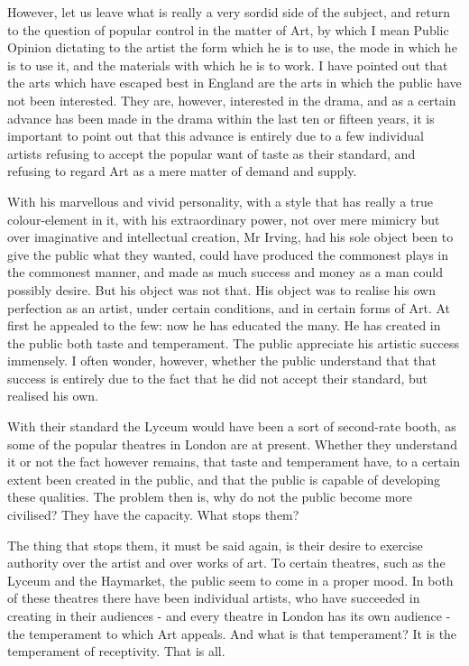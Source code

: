 However, let us leave what is really a very sordid side of the subject, and return to the question of popular control in the matter of Art, by which I mean Public Opinion dictating to the artist the form which he is to use, the mode in which he is to use it, and the materials with which he is to work. I have pointed out that the arts which have escaped best in England are the arts in which the public have not been interested. They are, however, interested in the drama, and as a certain advance has been made in the drama within the last ten or fifteen years, it is important to point out that this advance is entirely due to a few individual artists refusing to accept the popular want of taste as their standard, and refusing to regard Art as a mere matter of demand and supply.\par

With his marvellous and vivid personality, with a style that has really a true colour-element in it, with his extraordinary power, not over mere mimicry but over imaginative and intellectual creation, Mr Irving, had his sole object been to give the public what they wanted, could have produced the commonest plays in the commonest manner, and made as much success and money as a man could possibly desire. But his object was not that. His object was to realise his own perfection as an artist, under certain conditions, and in certain forms of Art. At first he appealed to the few: now he has educated the many. He has created in the public both taste and temperament. The public appreciate his artistic success immensely. I often wonder, however, whether the public understand that that success is entirely due to the fact that he did not accept their standard, but realised his own.\par

With their standard the Lyceum would have been a sort of second-rate booth, as some of the popular theatres in London are at present. Whether they understand it or not the fact however remains, that taste and temperament have, to a certain extent been created in the public, and that the public is capable of developing these qualities. The problem then is, why do not the public become more civilised? They have the capacity. What stops them?\par

The thing that stops them, it must be said again, is their desire to exercise authority over the artist and over works of art. To certain theatres, such as the Lyceum and the Haymarket, the public seem to come in a proper mood. In both of these theatres there have been individual artists, who have succeeded in creating in their audiences - and every theatre in London has its own audience - the temperament to which Art appeals. And what is that temperament? It is the temperament of receptivity. That is all.\par

